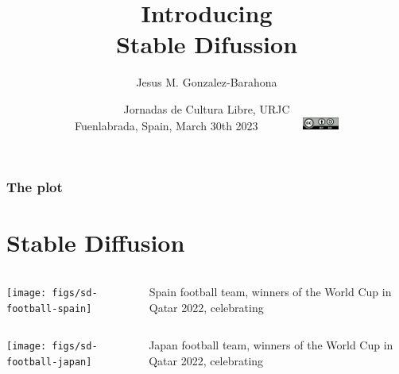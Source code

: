 \documentclass[17pt,aspectratio=169,hyperref={pdfusetitle,colorlinks,allcolors=olive}]{beamer}
\title[Stable Diffusion]{Introducing  \\ Stable Difussion}
\author[Jesus M. Gonzalez-Barahona]{Jesus M. Gonzalez-Barahona}
\institute[URJC]{Universidad Rey Juan Carlos \\
  \url{https://floss.social/@jgbarah} ~~~~~ \url{https://jgbarah.github.io/presentations}}
\date[Jornadas Cultura Libre, 2023]{\small Jornadas de Cultura Libre, URJC \\
  Fuenlabrada, Spain, March 30th 2023~~~~~~~~\includegraphics[width=1.2cm]{figs/by-sa}}
\begin{document}
\begin{frame}
  \maketitle
\end{frame}



\begin{frame}
  \frametitle{The plot}
\tableofcontents
\end{frame}


\section{Stable Diffusion}

\begin{frame}[fragile]

    \begin{columns}[T]
    \begin{column}{.58\textwidth}
        \texttt{[image: figs/sd-football-spain]}
    \end{column}%
    \hfill%
    \begin{column}{.38\textwidth}
  Spain football team, winners of the World Cup in Qatar 2022, celebrating

    \end{column}%
  \end{columns}

\end{frame}

\begin{frame}[fragile]

    \begin{columns}[T]
    \begin{column}{.58\textwidth}
        \texttt{[image: figs/sd-football-japan]}
    \end{column}%
    \hfill%
    \begin{column}{.38\textwidth}
  Japan football team, winners of the World Cup in Qatar 2022, celebrating

    \end{column}%
  \end{columns}

\end{frame}
\end{document}
